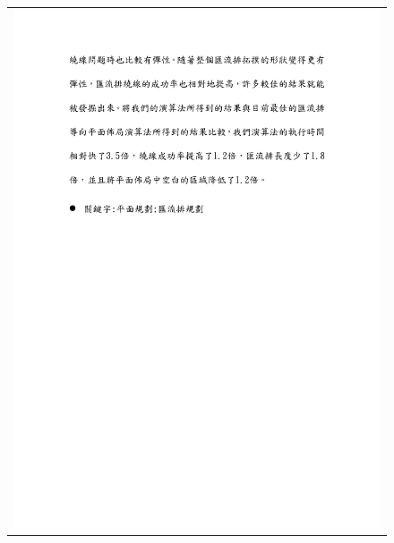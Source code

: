 \begin{figure}[h]
\centering
\vspace{-29mm}
\begin{tabular}{c}
\hspace{-36mm} \includegraphics[]{./abstract/ChineseAbstract2.pdf}
\end{tabular}
\end{figure}
\newpage
\newpage



%
%
